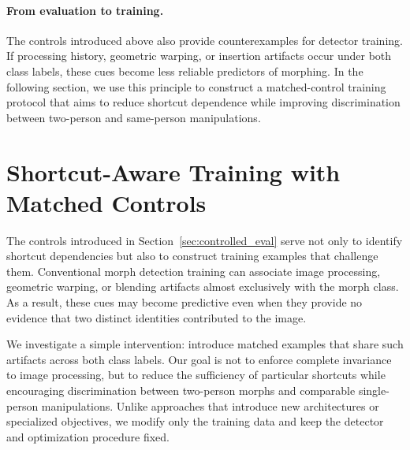 

\paragraph{From evaluation to training.}
The controls introduced above also provide counterexamples
for detector training. If processing history, geometric
warping, or insertion artifacts occur under both class
labels, these cues become less reliable predictors of
morphing. In the following section, we use this principle
to construct a matched-control training protocol that
aims to reduce shortcut dependence while improving
discrimination between two-person and same-person
manipulations.









\section{Shortcut-Aware Training with Matched Controls}
\label{sec:matched_training}

The controls introduced in Section~\ref{sec:controlled_eval}
serve not only to identify shortcut dependencies but also
to construct training examples that challenge them.
Conventional morph detection training can associate image
processing, geometric warping, or blending artifacts almost
exclusively with the morph class. As a result, these cues
may become predictive even when they provide no evidence
that two distinct identities contributed to the image.

We investigate a simple intervention: introduce matched
examples that share such artifacts across both class labels.
Our goal is not to enforce complete invariance to image
processing, but to reduce the sufficiency of particular
shortcuts while encouraging discrimination between
two-person morphs and comparable single-person
manipulations. Unlike approaches that introduce new
architectures or specialized objectives, we modify only
the training data and keep the detector and optimization
procedure fixed.

